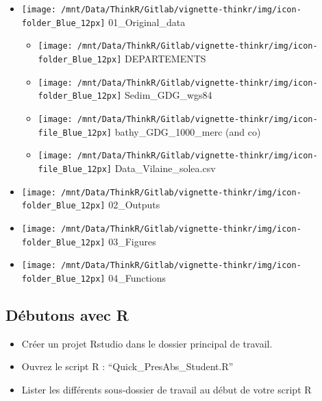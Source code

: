 \documentclass[french,a4paper]{article}
\providecommand{\tightlist}{%
  \setlength{\itemsep}{0pt}\setlength{\parskip}{0pt}}
\begin{document}
\begin{itemize}
\tightlist
\item
  \texttt{[image: /mnt/Data/ThinkR/Gitlab/vignette-thinkr/img/icon-folder\_Blue\_12px]}
  01\_Original\_data

  \begin{itemize}
  \tightlist
  \item
    \texttt{[image: /mnt/Data/ThinkR/Gitlab/vignette-thinkr/img/icon-folder\_Blue\_12px]}
    DEPARTEMENTS
  \item
    \texttt{[image: /mnt/Data/ThinkR/Gitlab/vignette-thinkr/img/icon-folder\_Blue\_12px]}
    Sedim\_GDG\_wgs84
  \item
    \texttt{[image: /mnt/Data/ThinkR/Gitlab/vignette-thinkr/img/icon-file\_Blue\_12px]}
    bathy\_GDG\_1000\_merc (and co)
  \item
    \texttt{[image: /mnt/Data/ThinkR/Gitlab/vignette-thinkr/img/icon-file\_Blue\_12px]}
    Data\_Vilaine\_solea.csv
  \end{itemize}
\item
  \texttt{[image: /mnt/Data/ThinkR/Gitlab/vignette-thinkr/img/icon-folder\_Blue\_12px]}
  02\_Outputs
\item
  \texttt{[image: /mnt/Data/ThinkR/Gitlab/vignette-thinkr/img/icon-folder\_Blue\_12px]}
  03\_Figures
\item
  \texttt{[image: /mnt/Data/ThinkR/Gitlab/vignette-thinkr/img/icon-folder\_Blue\_12px]}
  04\_Functions
\end{itemize}

\subsection{Débutons avec R}\label{debutons-avec-r}

\begin{itemize}
\tightlist
\item
  Créer un projet Rstudio dans le dossier principal de travail.
\item
  Ouvrez le script R : ``Quick\_PresAbs\_Student.R''
\item
  Lister les différents sous-dossier de travail au début de votre script
  R
\end{itemize}
\end{document}
